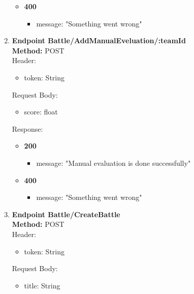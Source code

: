 \begin{enumerate}
\begin{itemize}
\begin{itemize}
        \end{itemize}
        \item \textbf{400} \\
        \begin{itemize}
            \item message: "Something went wrong"
        \end{itemize}
    \end{itemize}
    \item \textbf{Endpoint Battle/AddManualEveluation/:teamId} \\
    \textbf{Method:} POST \\
    Header:\\
    \begin{itemize}
        \item token: String
    \end{itemize}
    Request Body:\\
    \begin{itemize}
        \item score: float
    \end{itemize}
    Response:\\
    \begin{itemize}
        \item \textbf{200} \\
        \begin{itemize}
            \item message: "Manual evaluation is done successfully"
        \end{itemize}
        \item \textbf{400} \\
        \begin{itemize}
            \item message: "Something went wrong"
        \end{itemize}
    \end{itemize}
     \item \textbf{Endpoint Battle/CreateBattle} \\
    \textbf{Method:} POST \\
    Header:\\
    \begin{itemize}
        \item token: String
    \end{itemize}
    Request Body:\\
    \begin{itemize}
        \item title: String

\end{itemize}
\end{enumerate}
